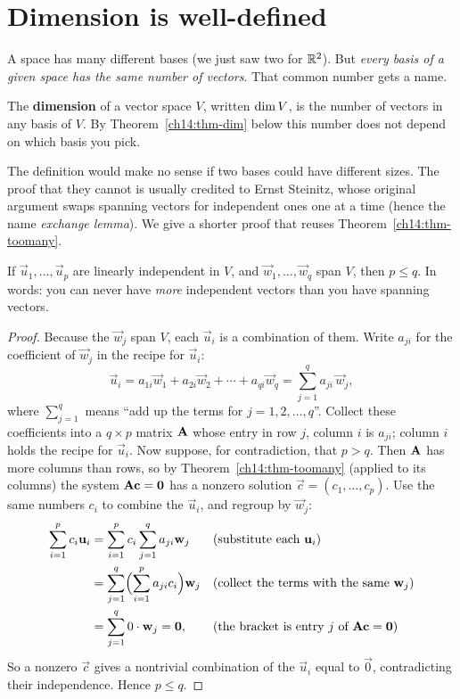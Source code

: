 \section{Dimension is well-defined}
\label{ch14:dim}

A space has many different bases (we just saw two for
$\mathbb{R}^2$). But \emph{every basis of a given space has the same number of vectors}.
That common number gets a name.

\begin{definition}[Dimension]
\label{ch14:def-dim}
The \textbf{dimension} of a vector space $V$, written $\operatorname{dim} V$, is the number of
vectors in any basis of $V$. By Theorem~\ref{ch14:thm-dim} below this number does not depend on
which basis you pick.
\end{definition}

The definition would make no sense if two bases could have different sizes.
The proof that they cannot is usually credited to Ernst Steinitz, whose original
argument swaps spanning vectors for independent ones one at a time (hence the name
\emph{exchange lemma}). We give a shorter proof that reuses
Theorem~\ref{ch14:thm-toomany}.

\begin{lemma}
\label{ch14:lem-steinitz}
If $\vec{u}_1,\dots,\vec{u}_p$ are linearly independent in $V$, and
$\vec{w}_1,\dots,\vec{w}_q$ span $V$, then $p \le q$. In words: you can never
have \emph{more} independent vectors than you have spanning vectors.
\end{lemma}

\begin{proof}
Because the $\vec{w}_j$ span $V$, each $\vec{u}_i$ is a combination of
them. Write $a_{ji}$ for the coefficient of $\vec{w}_j$ in the recipe for $\vec{u}_i$:
\[
  \vec{u}_i = a_{1i}\vec{w}_1 + a_{2i}\vec{w}_2 + \cdots + a_{qi}\vec{w}_q
  = \sum_{j=1}^{q} a_{ji}\,\vec{w}_j ,
\]
where $\sum_{j=1}^{q}$ means ``add up the terms for $j=1,2,\dots,q$''. Collect these coefficients
into a $q \times p$ matrix $\mathbf{A}$ whose entry in row $j$, column $i$ is $a_{ji}$; column $i$ holds
the recipe for $\vec{u}_i$. Now suppose, for contradiction,
that $p > q$. Then $\mathbf{A}$ has more columns than rows, so by
Theorem~\ref{ch14:thm-toomany} (applied to its columns) the system
$\mathbf{A}\mathbf{c}=\mathbf{0}$ has a nonzero solution $\vec{c}=(c_1,\dots,c_p)$. Use the
same numbers $c_i$ to combine the $\vec{u}_i$, and regroup by $\vec{w}_j$:
\begin{align*}
  \sum_{i=1}^{p} c_i \mathbf{u}_i
  &= \sum_{i=1}^{p} c_i \sum_{j=1}^{q} a_{ji}\mathbf{w}_j
     && \text{(substitute each } \mathbf{u}_i\text{)}\\
  &= \sum_{j=1}^{q}\Bigl(\sum_{i=1}^{p} a_{ji} c_i\Bigr)\mathbf{w}_j
     && \text{(collect the terms with the same } \mathbf{w}_j\text{)}\\
  &= \sum_{j=1}^{q} 0\cdot\mathbf{w}_j = \mathbf{0},
     && \text{(the bracket is entry } j \text{ of } \mathbf{A}\mathbf{c}=\mathbf{0}\text{)}
\end{align*}
So a nonzero
$\vec{c}$ gives a nontrivial combination of the $\vec{u}_i$ equal to $\vec{0}$,
contradicting their independence. Hence $p \le q$.
\end{proof}

